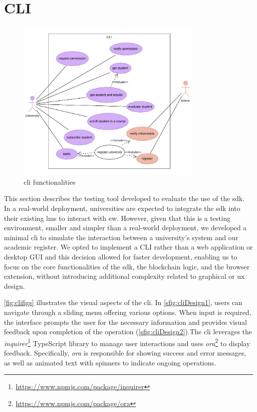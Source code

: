 \section{CLI}
\label{sec:cliDesign}
\begin{figure}
  \centering
  \includegraphics[width=0.8\textwidth]{figures/CLI use case diagram.pdf}
  \caption[Use case diagram representing the functionalities provided by the \acrshort{cli}.]{\acrshort{cli} functionalities}
  \label{fig:useCaseCli}
\end{figure}
This section describes the testing tool developed to evaluate the use of the \acrshort{sdk}. In a real-world deployment, universities are expected to integrate the \acrshort{sdk} into their existing \acrshort{lms} to interact with \acrlong{ew}. However, given that this is a testing environment, smaller and simpler than a real-world deployment, we developed a minimal \acrlong{cli} to simulate the interaction between a university's system and our academic register. We opted to implement a CLI rather than a web application or desktop GUI and this decision allowed for faster development, enabling us to focus on the core functionalities of the \acrshort{sdk}, the blockchain logic, and the browser extension, without introducing additional complexity related to graphical or \acrfull{ux} design.

\cref{fig:clifigs} illustrates the visual aspects of the \acrshort{cli}. In \cref{sfig:cliDesign1}, users can navigate through a sliding menu offering various options. When input is required, the interface prompts the user for the necessary information and provides visual feedback upon completion of the operation (\cref{sfig:cliDesign2}).The \acrshort{cli} leverages the \textit{inquirer}\footnote{\url{https://www.npmjs.com/package/inquirer}} TypeScript library to manage user interactions and uses \textit{ora}\footnote{\url{https://www.npmjs.com/package/ora}} to display feedback. Specifically, \textit{ora} is responsible for showing success and error messages, as well as animated text with spinners to indicate ongoing operations.


